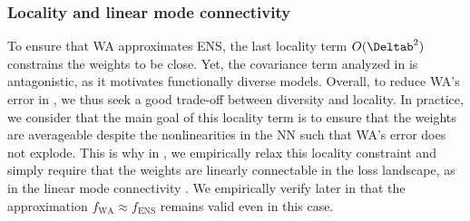 \subsubsection{Locality and linear mode connectivity}
\label{subsec:expression_loc_lir}
To ensure that WA approximates ENS, the last locality term $O(\Deltab^2)$ constrains the weights to be close.
Yet, the covariance term analyzed in  is antagonistic, as it motivates functionally diverse models.
Overall, to reduce WA's error in \ood, we thus seek a good trade-off between diversity and locality.
In practice, we consider that the main goal of this locality term is to ensure that the weights are averageable despite the nonlinearities in the NN such that WA's error does not explode.
This is why in , we empirically relax this locality constraint and simply require that the weights are linearly connectable in the loss landscape, as in the linear mode connectivity \cite{Frankle2020}. We empirically verify later in  that the approximation $f_{\text{WA}} \approx f_{\text{ENS}}$ remains valid even in this case.